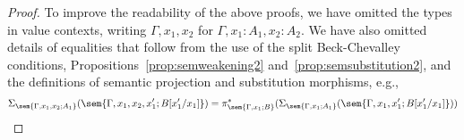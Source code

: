 \begin{proof}
To improve the readability of the above proofs, we have omitted the types in value contexts, writing ${\Gamma, x_1, x_2}$ for ${\Gamma, x_1 \!:\! A_1, x_2 \!:\! A_2}$. We have also omitted details of equalities that follow from the use of the split Beck-Chevalley conditions, Propositions~\ref{prop:semweakening2} and~\ref{prop:semsubstitution2}, and the definitions of semantic projection and substitution morphisms, e.g., 
\[
\Sigma_{\sem{\Gamma, x_1,x_2;A_1}}(\sem{\Gamma, x_1, x_2, x'_1; B[x'_1/x_1]}) = \pi^*_{\sem{\Gamma, x_1; B}}(\Sigma_{\sem{\Gamma, x_1;A_1}}(\sem{\Gamma, x_1, x'_1; B[x'_1/x_1]}))
\]
\end{proof}

\renewcommand\thesection{\thechapter.\arabic{section}}

